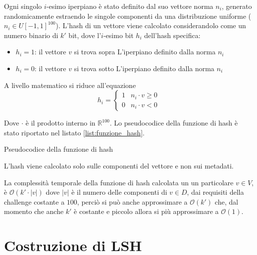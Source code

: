 Ogni singolo $i$-esimo iperpiano è stato definito dal suo vettore norma $n_i$,
generato randomicamente estraendo le singole componenti da una distribuzione uniforme 
($n_i \in U[-1,1]^{100}$). L'hash di un vettore viene calcolato considerandolo 
come un numero binario di $k'$ bit, dove l'$i$-esimo bit $h_i$ dell'hash specifica:
\begin{itemize}
    \item $h_i = 1$: il vettore $v$ si trova sopra L'iperpiano definito dalla 
    norma $n_i$
    \item $h_i = 0$: il vettore $v$ si trova sotto L'iperpiano definito dalla 
    norma $n_i$
\end{itemize}

A livello matematico si riduce all'equazione 
$$h_i = \begin{cases}
    1 & n_i \cdot v \ge 0\\
    0 & n_i \cdot v < 0
\end{cases}$$ 

Dove $\cdot$ è il prodotto interno in $\mathbb{R}^{100}$. Lo pseudocodice della 
funzione di hash è stato riportato nel listato \ref{list:funzione_hash}.

\begin{algorithm}
    \SetAlgoLined

    \caption{Pseudocodice della funzione di hash}
    \label{list:funzione_hash}
\end{algorithm}

\begin{nota}
    L'hash viene calcolato solo sulle componenti del vettore e non sui metadati.
\end{nota}

La complessità temporale della funzione di hash calcolata un un particolare $v\in V$,
è $\mathcal{O}(k' \cdot |v|)$ dove 
$|v|$ è il numero delle componenti di $v\in D$, dai requisiti della challenge 
costante a $100$, perciò si può anche approssimare a $\mathcal{O}(k')$ che, dal momento 
che anche $k'$ è costante e piccolo allora si più approssimare a $\mathcal{O}(1)$.

\section{Costruzione di LSH}

